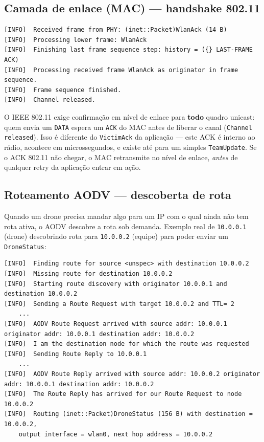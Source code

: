 \documentclass[11pt,a4paper]{article}
\begin{document}
\subsection{Camada de enlace (MAC) --- handshake 802.11}

\begin{lstlisting}[style=simlog]
[INFO]	Received frame from PHY: (inet::Packet)WlanAck (14 B)
[INFO]	Processing lower frame: WlanAck
[INFO]	Finishing last frame sequence step: history = ({} LAST-FRAME ACK)
[INFO]	Processing received frame WlanAck as originator in frame sequence.
[INFO]	Frame sequence finished.
[INFO]	Channel released.
\end{lstlisting}

\begin{explica}
O IEEE 802.11 exige confirmação em nível de enlace para \textbf{todo} quadro
unicast: quem envia um \texttt{DATA} espera um \texttt{ACK} do MAC antes de
liberar o canal (\texttt{Channel released}). Isso é diferente do
\texttt{VictimAck} da aplicação --- este ACK é interno ao rádio, acontece em
microssegundos, e existe até para um simples \texttt{TeamUpdate}. Se o ACK
802.11 não chegar, o MAC retransmite no nível de enlace, \emph{antes} de
qualquer retry da aplicação entrar em ação.
\end{explica}

\subsection{Roteamento AODV --- descoberta de rota}

Quando um drone precisa mandar algo para um IP com o qual ainda não tem rota
ativa, o AODV descobre a rota sob demanda. Exemplo real de
\texttt{10.0.0.1} (drone) descobrindo rota para \texttt{10.0.0.2} (equipe)
para poder enviar um \texttt{DroneStatus}:

\begin{lstlisting}[style=simlog]
[INFO]	Finding route for source <unspec> with destination 10.0.0.2
[INFO]	Missing route for destination 10.0.0.2
[INFO]	Starting route discovery with originator 10.0.0.1 and destination 10.0.0.2
[INFO]	Sending a Route Request with target 10.0.0.2 and TTL= 2
	...
[INFO]	AODV Route Request arrived with source addr: 10.0.0.1 originator addr: 10.0.0.1 destination addr: 10.0.0.2
[INFO]	I am the destination node for which the route was requested
[INFO]	Sending Route Reply to 10.0.0.1
	...
[INFO]	AODV Route Reply arrived with source addr: 10.0.0.2 originator addr: 10.0.0.1 destination addr: 10.0.0.2
[INFO]	The Route Reply has arrived for our Route Request to node 10.0.0.2
[INFO]	Routing (inet::Packet)DroneStatus (156 B) with destination = 10.0.0.2,
	output interface = wlan0, next hop address = 10.0.0.2
\end{lstlisting}
\end{document}
